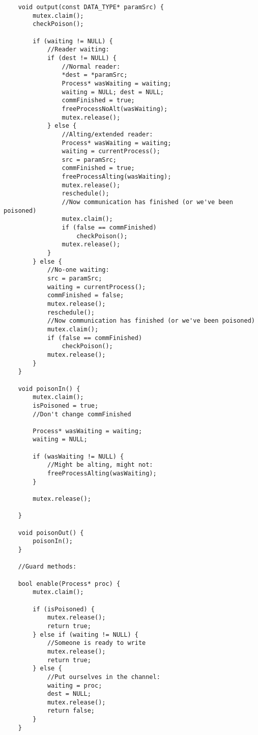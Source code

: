 \documentclass{article}
\begin{document}
{\begin{verbatim}
    void output(const DATA_TYPE* paramSrc) {
        mutex.claim();
        checkPoison();

        if (waiting != NULL) {
            //Reader waiting:
            if (dest != NULL) {
                //Normal reader:
                *dest = *paramSrc;
                Process* wasWaiting = waiting;
                waiting = NULL; dest = NULL;
                commFinished = true;
                freeProcessNoAlt(wasWaiting);
                mutex.release();
            } else {
                //Alting/extended reader:
                Process* wasWaiting = waiting;
                waiting = currentProcess();
                src = paramSrc;
                commFinished = true;
                freeProcessAlting(wasWaiting);
                mutex.release();
                reschedule();
                //Now communication has finished (or we've been poisoned)
                mutex.claim();
                if (false == commFinished)
                    checkPoison();
                mutex.release();
            }
        } else {
            //No-one waiting:
            src = paramSrc;
            waiting = currentProcess();
            commFinished = false;
            mutex.release();            
            reschedule();
            //Now communication has finished (or we've been poisoned)
            mutex.claim();
            if (false == commFinished)
                checkPoison();
            mutex.release();
        }
    }

    void poisonIn() {
        mutex.claim();
        isPoisoned = true;
        //Don't change commFinished
        
        Process* wasWaiting = waiting;
        waiting = NULL;

        if (wasWaiting != NULL) {
            //Might be alting, might not:
            freeProcessAlting(wasWaiting);
        }

        mutex.release();

    }

    void poisonOut() {
        poisonIn();
    }

    //Guard methods:

    bool enable(Process* proc) {
        mutex.claim();

        if (isPoisoned) {
            mutex.release();
            return true;
        } else if (waiting != NULL) {
            //Someone is ready to write
            mutex.release();
            return true;
        } else {
            //Put ourselves in the channel:
            waiting = proc;
            dest = NULL;
            mutex.release();
            return false;
        }
    }


\end{verbatim}}
\end{document}
